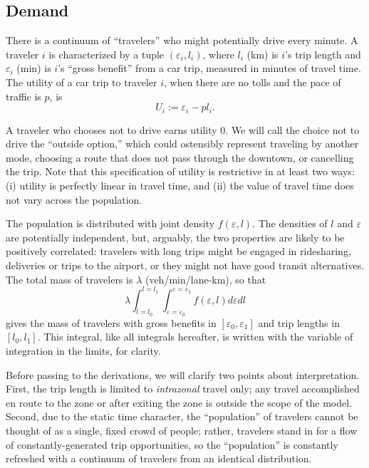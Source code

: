 \documentclass[preprint,authoryear]{elsarticle}
\newcommand{\ve}{\varepsilon}
\begin{document}
\subsection{Demand}
\label{ssec:demand}

There is a continuum of ``travelers'' who might potentially drive every minute. A traveler $i$ is characterized by a tuple $(\ve_i,l_i)$, where $l_i$ (km) is $i$'s trip length and $\ve_i$ (min) is $i$'s ``gross benefit'' from a car trip, measured in minutes of travel time. The utility of a car trip to traveler $i$, when there are no tolls and the pace of traffic is $p$, is
\begin{equation}
	U_i := \ve_i - pl_i.
\end{equation}

A traveler who chooses not to drive earns utility 0. We will call the choice not to drive the ``outside option,'' which could ostensibly represent traveling by another mode, choosing a route that does not pass through the downtown, or cancelling the trip. Note that this specification of utility is restrictive in at least two ways: (i) utility is perfectly linear in travel time, and (ii) the value of travel time does not vary across the population. 

The population is distributed with joint density $f(\ve,l)$. The densities of $l$ and $\ve$ are potentially independent, but, arguably, the two properties are likely to be positively correlated: travelers with long trips might be engaged in ridesharing, deliveries or trips to the airport, or they might not have good transit alternatives. The total mass of travelers is $\lambda$ (veh/min/lane-km), so that 
$$
\lambda \int_{l=l_0}^{l=l_1}\int_{\ve=\ve_0}^{\ve=\ve_1}f(\ve,l)d\ve dl
$$
gives the mass of travelers with gross benefits in $[\ve_0,\ve_1]$ and trip lengths in $[l_0,l_1]$. This integral, like all integrals hereafter, is written with the variable of integration in the limits, for clarity.

Before passing to the derivations, we will clarify two points about interpretation. First, the trip length is limited to \emph{intrazonal} travel only; any travel accomplished en route to the zone or after exiting the zone is outside the scope of the model. Second, due to the static time character, the ``population'' of travelers cannot be  thought of as a single, fixed crowd of people; rather, travelers stand in for a flow of constantly-generated trip opportunities, so the ``population'' is constantly refreshed with a continuum of travelers from an identical distribution.
\end{document}
